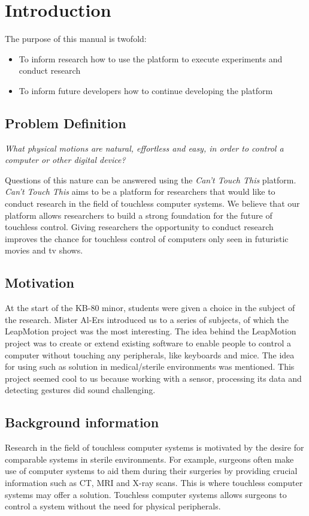 \documentclass{standalone}
\begin{document}
  \section{Introduction}
  The purpose of this manual is twofold:
  \begin{itemize}
    \tightlist{}
    \item To inform research how to use the platform to execute experiments and
      conduct research
    \item To inform future developers how to continue developing the platform
  \end{itemize}

  \subsection{Problem Definition}
  \textit{What physical motions are natural, effortless and easy, in order to
    control a computer or other digital device?}

  Questions of this nature can be answered using the \textit{Can't Touch This}
  platform. \textit{Can't Touch This} aims to be a platform for researchers that
  would like to conduct research in the field of touchless computer systems. We
  believe that our platform allows researchers to build a strong foundation for
  the future of touchless control. Giving researchers the opportunity to conduct
  research improves the chance for touchless control of computers only seen in
  futuristic movies and tv shows.

  \subsection{Motivation}
  At the start of the KB-80 minor, students were given a choice in the subject
  of the research. Mister Al-Ers introduced us to a series of subjects, of which
  the LeapMotion project was the most interesting. The idea behind the
  LeapMotion project was to create or extend existing software to enable people
  to control a computer without touching any peripherals, like keyboards and
  mice. The idea for using such as solution in medical/sterile environments was
  mentioned. This project seemed cool to us because working with a sensor,
  processing its data and detecting gestures did sound challenging.

  \subsection{Background information}
  Research in the field of touchless computer systems is motivated by the desire
  for comparable systems in sterile environments. For example, surgeons often
  make use of computer systems to aid them during their surgeries by providing
  crucial information such as CT, MRI and X-ray scans. This is where touchless
  computer systems may offer a solution. Touchless computer systems allows
  surgeons to control a system without the need for physical peripherals.

  \clearpage
\end{document}
